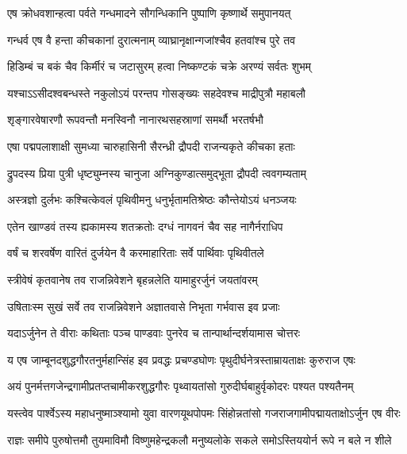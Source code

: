 \twolineshloka
{एष क्रोधवशान्हत्वा पर्वते गन्धमादने}
{सौगन्धिकानि पुष्पाणि कृष्णार्थे समुपानयत्}


\twolineshloka
{गन्धर्व एष वै हन्ता कीचकानां दुरात्मनाम्}
{व्याघ्रानृक्षान्गजांश्चैव हतवांश्च पुरे तव}


\twolineshloka
{हिडिम्बं च बकं चैव किर्मीरं च जटासुरम्}
{हत्वा निष्कण्टकं चक्रे अरण्यं सर्वतः शुभम्}


\twolineshloka
{यश्चाऽऽसीदश्वबन्धस्ते नकुलोऽयं परन्तप}
{गोसङ्ख्यः सहदेवश्च माद्रीपुत्रौ महाबलौ}


\twolineshloka
{शृङ्गारवेषारणौ रूपवन्तौ मनस्विनौ}
{नानारथसहस्राणां समर्थौ भरतर्षभौ}


\twolineshloka
{एषा पद्मपलाशाक्षी सुमध्या चारुहासिनी}
{सैरन्ध्री द्रौपदी राजन्यकृते कीचका हताः}


\twolineshloka
{द्रुपदस्य प्रिया पुत्री धृष्ट्युम्नस्य चानुजा}
{अग्निकुण्डात्समुद्भूता द्रौपदी त्ववगम्यताम्}



\twolineshloka
{अस्त्रज्ञो दुर्लभः कश्चित्केवलं पृथिवीमनु}
{धनुर्भृतामतिश्रेष्ठः कौन्तेयोऽयं धनञ्जयः}


\twolineshloka
{एतेन खाण्डवं तस्य ह्यकामस्य शतक्रतोः}
{दग्धं नागवनं चैव सह नागैर्नराधिप}


\twolineshloka
{वर्षं च शरवर्षेण वारितं दुर्जयेन वै}
{करमाहारिताः सर्वे पार्थिवाः पृथिवीतले}


\twolineshloka
{स्त्रीवेषं कृतवानेष तव राजन्निवेशने}
{बृहन्नलेति यामाहुरर्जुनं जयतांवरम्}


\twolineshloka
{उषिताःस्म सुखं सर्वे तव राजन्निवेशने}
{अज्ञातवासे निभृता गर्भवास इव प्रजाः}



\twolineshloka
{यदाऽर्जुनेन ते वीराः कथिताः पञ्च पाण्डवाः}
{पुनरेव च तान्पार्थान्दर्शयामास चोत्तरः}




\twolineshloka
{य एष जाम्बूनदशुद्धगौरतनुर्महान्सिंह इव प्रवद्धः}
{प्रचण्डघोणः पृथुदीर्घनेत्रस्ताम्रायताक्षः कुरुराज एषः}


\twolineshloka
{अयं पुनर्मत्तगजेन्द्रगामीप्रतप्तचामीकरशुद्धगौरः}
{पृथ्वायतांसो गुरुदीर्घबाहुर्वृकोदरः पश्यत पश्यतैनम्}


\twolineshloka
{यस्त्वेव पार्श्वेऽस्य महाधनुष्माञ्श्यामो युवा वारणयूथपोपमः}
{सिंहोन्नतांसो गजराजगामीपद्मायताक्षोऽर्जुन एष वीरः}


\twolineshloka
{राज्ञः समीपे पुरुषोत्तमौ तुयमाविमौ विष्णुमहेन्द्रकलौ}
{मनुष्यलोके सकले समोऽस्तिययोर्न रूपे न बले न शीले}



